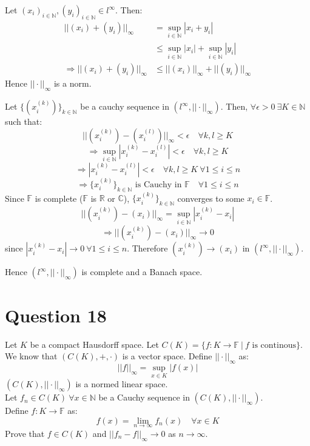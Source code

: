 \documentclass{article}
\begin{document}
	Let $(x_i)_{i \in \mathbb{N}}, (y_i)_{i \in \mathbb{N}} \in l^\infty$.
	Then:
	\begin{align*}
		||(x_i) + (y_i)||_\infty &= \sup_{i \in \mathbb{N}} |x_i + y_i| \\
		&\le \sup_{i \in \mathbb{N}} |x_i| + \sup_{i \in \mathbb{N}} |y_i| \\
		\Rightarrow ||(x_i) + (y_i)||_\infty &\le ||(x_i)||_\infty + ||(y_i)||_\infty
	\end{align*}
	Hence $||\cdot||_\infty$ is a norm.

	Let $\{(x_i^{(k)})\}_{k \in \mathbb{N}}$ be a cauchy sequence in $(l^\infty, ||\cdot||_\infty)$.
	Then, $\forall \epsilon > 0 ~ \exists K \in \mathbb{N}$ such that:
	\[ ||(x_i^{(k)}) - (x_i^{(l)})||_\infty < \epsilon \quad \forall k, l \ge K \]
	\[
		\Rightarrow \sup_{i \in \mathbb{N}} |x_i^{(k)} - x_i^{(l)}| < \epsilon
		\quad \forall k, l \ge K
	\]
	\[
		\Rightarrow |x_i^{(k)} - x_i^{(l)}| < \epsilon
		\quad \forall k, l \ge K ~ \forall 1 \le i \le n
	\]
	\[
		\Rightarrow \{x_i^{(k)}\}_{k \in \mathbb{N}} \text{ is Cauchy in } \mathbb{F}
		\quad \forall 1 \le i \le n
	\]
	Since $\mathbb{F}$ is complete ($\mathbb{F}$ is $\mathbb{R}$ or $\mathbb{C}$),
	$\{x_i^{(k)}\}_{k \in \mathbb{N}}$ converges to some $x_i \in \mathbb{F}$. \\
	\[ ||(x_i^{(k)}) - (x_i)||_\infty = \sup_{i \in \mathbb{N}} |x_i^{(k)} - x_i| \]
	\[ \Rightarrow ||(x_i^{(k)}) - (x_i)||_\infty \to 0 \]
	since $|x_i^{(k)} - x_i| \to 0 ~ \forall 1 \le i \le n$.
	Therefore $(x_i^{(k)}) \to (x_i)$ in $(l^\infty, ||\cdot||_\infty)$.

	Hence $(l^\infty, ||\cdot||_\infty)$ is complete and a Banach space.

\section{Question 18}

	Let $K$ be a compact Hausdorff space.
	Let $C(K) = \{f: K \to \mathbb{F} ~ | ~ f \text{ is continous}\}$.
	We know that $(C(K), +, \cdot)$ is a vector space.
	Define $||\cdot||_\infty$ as:
	\[ ||f||_\infty = \sup_{x \in K} |f(x)| \]
	$(C(K), ||\cdot||_\infty)$ is a normed linear space. \\
	Let $f_n \in C(K) ~ \forall x \in \mathbb{N}$ be a Cauchy sequence in
	$(C(K), ||\cdot||_\infty)$. \\
	Define $f: K \to \mathbb{F}$ as:
	\[ f(x) = \lim_{n \to \infty} f_n(x) \quad \forall x \in K \]
	Prove that $f \in C(K)$ and $||f_n - f||_\infty \to 0$ as $n \to \infty$. \\
\end{document}
